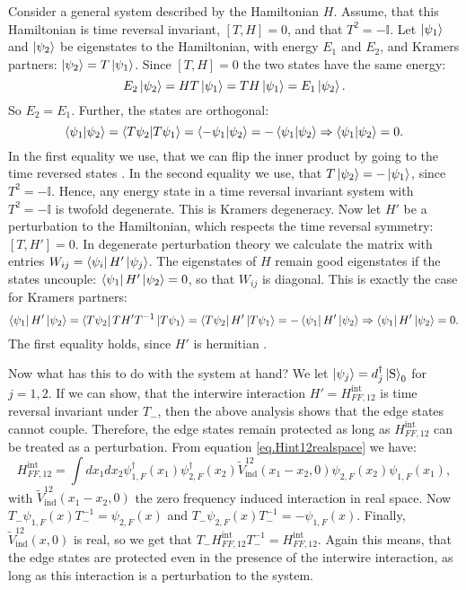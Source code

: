 Consider a general system described by the Hamiltonian $H$. Assume, that this Hamiltonian is time reversal invariant, $[T, H] = 0$, and that $T^2 = -\mathbb{I}$. Let $\ket{\psi_1}$ and $\ket{\psi_2}$ be eigenstates to the Hamiltonian, with energy $E_1$ and $E_2$, and Kramers partners: $\ket{\psi_2} = T\ket{\psi_1}$. Since $[T, H] = 0$ the two states have the same energy: 
\begin{equation}
E_2\ket{\psi_2} = HT\ket{\psi_1} = TH\ket{\psi_1} = E_1\ket{\psi_2}. \nonumber
\end{equation}
So $E_2 = E_1$. Further, the states are orthogonal:
\begin{equation}
\braket{\psi_1|\psi_2} = \braket{T\psi_2|T\psi_1} = \braket{-\psi_1|\psi_2} = -\braket{\psi_1|\psi_2} \Rightarrow \braket{\psi_1|\psi_2} = 0. \nonumber  
\end{equation}
In the first equality we use, that we can flip the inner product by going to the time reversed states \cite{Sakurai}. In the second equality we use, that $T\ket{\psi_2} = -\ket{\psi_1}$, since $T^2 = -\mathbb{I}$. Hence, any energy state in a time reversal invariant system with $T^2 = -\mathbb{I}$ is twofold degenerate. This is Kramers degeneracy. Now let $H'$ be a perturbation to the Hamiltonian, which respects the time reversal symmetry: $[T, H'] = 0$. In degenerate perturbation theory we calculate the matrix with entries $W_{ij} = \bra{\psi_i}H'\ket{\psi_j}$. The eigenstates of $H$ remain good eigenstates if the states uncouple: $\bra{\psi_1}H'\ket{\psi_2} = 0$, so that $W_{ij}$ is diagonal. This is exactly the case for Kramers partners: 
\begin{equation}
\bra{\psi_1}H'\ket{\psi_2} = \bra{T\psi_2}TH'T^{-1}\ket{T\psi_1} = \bra{T\psi_2}H'\ket{T\psi_1} = -\bra{\psi_1}H'\ket{\psi_2} \Rightarrow \bra{\psi_1}H'\ket{\psi_2} = 0. \nonumber
\end{equation}
The first equality holds, since $H'$ is hermitian \cite{Sakurai}. 

Now what has this to do with the system at hand? We let $\ket{\psi_j} = d^\dagger_j\ket{\text{S}}_0$ for $j = 1, 2$. If we can show, that the interwire interaction $H' = H^\text{int}_{FF,12}$ is time reversal invariant under $T_-$, then the above analysis shows that the edge states cannot couple. Therefore, the edge states remain protected as long as $H^\text{int}_{FF,12}$ can be treated as a perturbation. From equation \eqref{eq.Hint12realspace} we have:
\begin{equation}
H^\text{int}_{FF,12} = \int dx_1 dx_2 \psi^\dagger_{1,F}(x_1)\psi^\dagger_{2,F}(x_2) \tilde{V}_{\text{ind}}^{12}(x_1-x_2,0) \psi_{2,F}(x_2)\psi_{1,F}(x_1),
\end{equation}
with $\tilde{V}_{\text{ind}}^{12}(x_1-x_2,0)$ the zero frequency induced interaction in real space. Now $T_-\psi_{1,F}(x)T^{-1}_- = \psi_{2,F}(x)$ and $T_-\psi_{2,F}(x)T^{-1}_- = -\psi_{1,F}(x)$. Finally, $\tilde{V}_{\text{ind}}^{12}(x, 0)$ is real, so we get that $T_-H^\text{int}_{FF,12}T_-^{-1} = H^\text{int}_{FF,12}$. Again this means, that the edge states are protected even in the presence of the interwire interaction, as long as this interaction is a perturbation to the system. 

